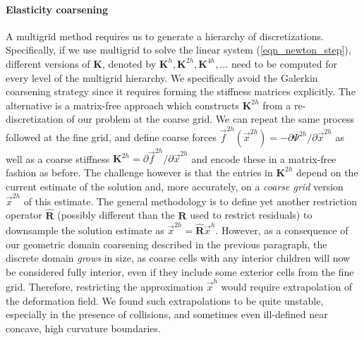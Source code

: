 \paragraph{Elasticity coarsening} A multigrid method requires us to generate a hierarchy of discretizations. Specifically, if we use multigrid to solve the linear system
(\ref{eqn_newton_step}), different versions of $\mathbf{K}$, denoted by $\mathbf{K}^h,\mathbf{K}^{2h},\mathbf{K}^{4h},\ldots$ need to be computed for every level of the multigrid
hierarchy. We specifically avoid the Galerkin coarsening strategy since it requires forming the stiffness matrices explicitly. The alternative is a 
matrix-free approach which constructs $\mathbf{K}^{2h}$ from a re-discretization of our problem at the coarse grid. We can repeat the same process followed at the fine grid, and
define coarse forces $\vec{f}^{2h}(\vec{x}^{2h})=-\partial\Psi^{2h}/\partial\vec{x}^{2h}$ as well as a coarse stiffness $\mathbf{K}^{2h}=\partial\vec{f}^{2h}/\partial\vec{x}^{2h}$ and
encode these in a matrix-free fashion as before. The challenge however is that the entries in $\mathbf{K}^{2h}$ depend on the current estimate of the solution and, more accurately, on a
\emph{coarse grid} version $\vec{x}^{2h}$ of this estimate. The general methodology is to define yet another restriction operator $\hat{\mathbf{R}}$ (possibly different than the
$\mathbf{R}$ used to restrict residuals) to downsample the solution estimate as $\vec{x}^{2h}=\hat{\mathbf{R}}\vec{x}^h$. However, as a consequence of our geometric domain coarsening
described in the previous paragraph, the discrete domain \emph{grows} in size, as coarse cells with any interior children will now be considered fully interior, even if they include some
exterior cells from the fine grid. Therefore, restricting the approximation $\vec{x}^h$ would require extrapolation of the deformation field. We found such extrapolations to be
quite unstable, especially in the presence of collisions, and sometimes even ill-defined near concave, high curvature boundaries.

